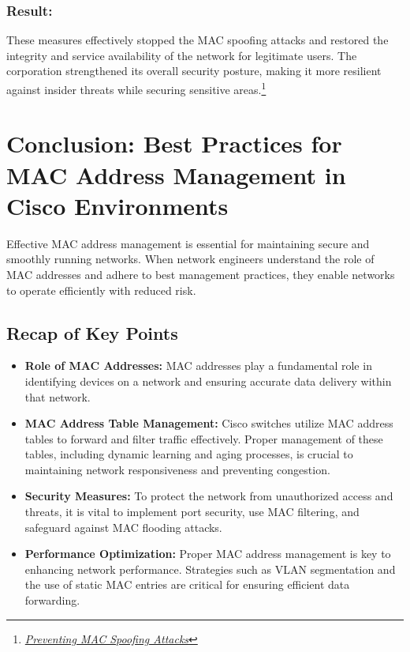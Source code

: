 \documentclass[11pt,a4paper]{article}
\begin{document}
\subsubsection*{Result:}
These measures effectively stopped the MAC spoofing attacks and restored the integrity and service availability of the network for legitimate users. The corporation strengthened its overall security posture, making it more resilient against insider threats while securing sensitive areas.\footnote{\href{https://community.cisco.com/kxiwq67737/attachments/kxiwq67737/4561-docs-security/6636/1/Mac_spoofing_case_study_v2.pdf}{\textit{Preventing MAC Spoofing Attacks}}}

\section*{Conclusion: Best Practices for MAC Address Management in Cisco Environments}

Effective MAC address management is essential for maintaining secure and smoothly running networks. When network engineers understand the role of MAC addresses and adhere to best management practices, they enable networks to operate efficiently with reduced risk.

\subsection*{Recap of Key Points}
    \begin{itemize}
        \item \textbf{Role of MAC Addresses:} MAC addresses play a fundamental role in identifying devices on a network and ensuring accurate data delivery within that network.
        \item \textbf{MAC Address Table Management:} Cisco switches utilize MAC address tables to forward and filter traffic effectively. Proper management of these tables, including dynamic learning and aging processes, is crucial to maintaining network responsiveness and preventing congestion.
        \item \textbf{Security Measures:} To protect the network from unauthorized access and threats, it is vital to implement port security, use MAC filtering, and safeguard against MAC flooding attacks.
        \item \textbf{Performance Optimization:} Proper MAC address management is key to enhancing network performance. Strategies such as VLAN segmentation and the use of static MAC entries are critical for ensuring efficient data forwarding.
    \end{itemize}
\end{document}

